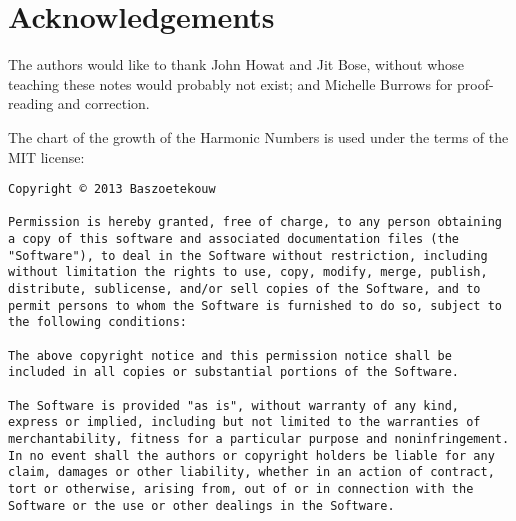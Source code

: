 \chapter{Acknowledgements}

The authors would like to thank John Howat and Jit Bose, without whose
teaching these notes would probably not exist; and Michelle Burrows
for proof-reading and correction.

The chart of the growth of the Harmonic Numbers is used under the
terms of the MIT license:

\begin{verbatim}
Copyright © 2013 Baszoetekouw

Permission is hereby granted, free of charge, to any person obtaining a copy of this software and associated documentation files (the "Software"), to deal in the Software without restriction, including without limitation the rights to use, copy, modify, merge, publish, distribute, sublicense, and/or sell copies of the Software, and to permit persons to whom the Software is furnished to do so, subject to the following conditions:

The above copyright notice and this permission notice shall be included in all copies or substantial portions of the Software.

The Software is provided "as is", without warranty of any kind, express or implied, including but not limited to the warranties of merchantability, fitness for a particular purpose and noninfringement. In no event shall the authors or copyright holders be liable for any claim, damages or other liability, whether in an action of contract, tort or otherwise, arising from, out of or in connection with the Software or the use or other dealings in the Software.
\end{verbatim}